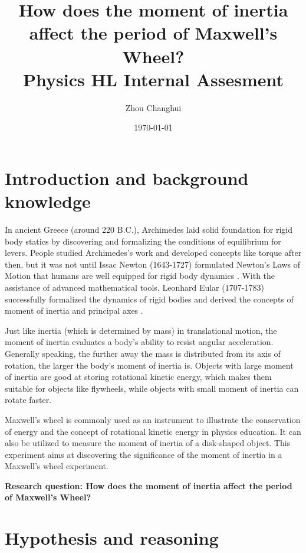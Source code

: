\documentclass[a4paper]{article}
\begin{document}
\begin{titlepage}
    \title{\textbf{How does the moment of inertia affect the period of Maxwell's Wheel? \\ \small Physics HL Internal Assesment}}
    \author{Zhou Changhui}
    \date{\today}
    \maketitle
\end{titlepage}

\section{Introduction and background knowledge}

In ancient Greece (around 220 B.C.), Archimedes laid solid foundation for rigid body statics by discovering and formalizing the conditions of equilibrium for levers. People studied Archimedes's work and developed concepts like torque after then, but it was not until Issac Newton (1643-1727) formulated Newton's Laws of Motion that humans are well equipped for rigid body dynamics \cite{farber-1961}. With the assistance of advanced mathematical tools, Leonhard Eular (1707-1783) successfully formalized the dynamics of rigid bodies and derived the concepts of moment of inertia and principal axes \cite{marquina2016leonhard}.

Just like inertia (which is determined by mass) in translational motion, the moment of inertia evaluates a body's ability to resist angular acceleration. Generally speaking, the further away the mass is distributed from its axis of rotation, the larger the body's moment of inertia is. Objects with large moment of inertia are good at storing rotational kinetic energy, which makes them suitable for objects like flywheels, while objects with small moment of inertia can rotate faster. 

Maxwell's wheel is commonly used as an instrument to illustrate the conservation of energy and the concept of rotational kinetic energy in physics education. It can also be utilized to measure the moment of inertia of a disk-shaped object. This experiment aims at discovering the significance of the moment of inertia in a Maxwell's wheel experiment.

\textbf{Research question: How does the moment of inertia affect the period of Maxwell's Wheel?}

\section{Hypothesis and reasoning}
\end{document}
